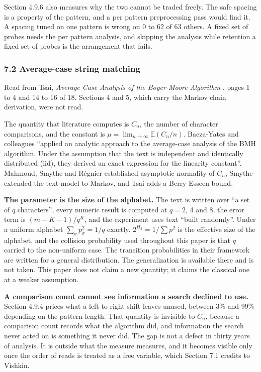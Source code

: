 Section 4.9.6 also measures why the two cannot be traded freely. The safe spacing is a property of the pattern, and a per pattern preprocessing pass would find it. A spacing tuned on one pattern is wrong on 0 to 62 of 63 others. A fixed set of probes needs the per pattern analysis, and skipping the analysis while retention a fixed set of probes is the arrangement that fails.

\subsubsection{7.2 Average-case string matching}

Read from Tsai, \emph{Average Case Analysis of the Boyer-Moore Algorithm} \cite{src:Tsai}, pages 1 to 4 and 14 to 16 of 18. Sections 4 and 5, which carry the Markov chain derivation, were not read.

The quantity that literature computes is \(C_n\), the number of character comparisons, and the constant is \(\mu = \lim_{n\to\infty} \mathbb{E}(C_n/n)\). Baeza-Yates and colleagues ``applied an analytic approach to the average-case analysis of the BMH algorithm. Under the assumption that the text is independent and identically distributed (iid), they derived an exact expression for the linearity constant''. Mahmoud, Smythe and Régnier established asymptotic normality of \(C_n\), Smythe extended the text model to Markov, and Tsai adds a Berry-Esseen bound.

\noindent\textbf{The parameter is the size of the alphabet.} The text is written over ``a set of \(q\) characters'', every numeric result is computed at \(q = 2\), 4 and 8, the error term is \((m-K-1)/q^K\), and the experiment uses text ``built randomly''. Under a uniform alphabet \(\sum_\sigma p_\sigma^2 = 1/q\) exactly. \(2^{H_2} = 1/\sum p^2\) is the effective size of the alphabet, and the collision probability used throughout this paper is that \(q\) carried to the non-uniform case. The transition probabilities in their framework are written for a general distribution. The generalization is available there and is not taken. This paper does not claim a new quantity; it claims the classical one at a weaker assumption.

\noindent\textbf{A comparison count cannot see information a search declined to use.} Section 4.9.4 prices what a left to right shift leaves unused, between 3\% and 99\% depending on the pattern length. That quantity is invisible to \(C_n\), because a comparison count records what the algorithm did, and information the search never acted on is something it never did. The gap is not a defect in thirty years of analysis. It is outside what the measure measures, and it becomes visible only once the order of reads is treated as a free variable, which Section 7.1 credits to Vishkin.

